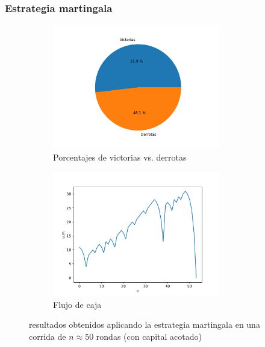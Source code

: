 \documentclass{article}
\begin{document}
  \subsubsection{Estrategia martingala}
  \begin{figure}[H]
    \centering
    \begin{subfigure}{0.5\textwidth}
      \centering
      \includegraphics[width=0.8\textwidth]{generated/porcentajes-martingala-acotado.pdf}
      \caption{Porcentajes de victorias vs. derrotas}
    \end{subfigure}%
	\begin{subfigure}{0.5\textwidth}
	  \centering
	    \includegraphics[width=0.8\textwidth]{generated/capital-martingala-acotado.pdf}
      \caption{Flujo de caja}
    \end{subfigure}
    \caption{resultados obtenidos aplicando la estrategia martingala en una corrida de $n \approx 50$ rondas (con capital acotado)}
  \end{figure}
\end{document}
